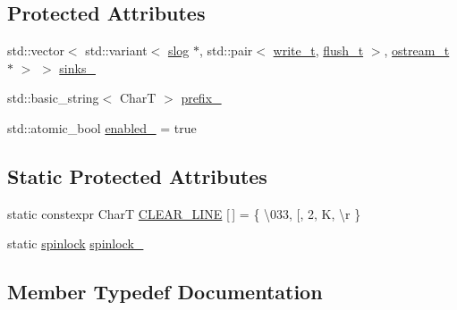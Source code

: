 \subsection*{Protected Attributes}
\begin{DoxyCompactItemize}
\item 
std\+::vector$<$ std\+::variant$<$ \hyperlink{structdevfix_1_1base_1_1slog}{slog} $\ast$, std\+::pair$<$ \hyperlink{structdevfix_1_1base_1_1slog_a5897ebe6b65ffd7a1845a6bca989f288}{write\+\_\+t}, \hyperlink{structdevfix_1_1base_1_1slog_a5c957ca5d7392786ede9f813ec40fb40}{flush\+\_\+t} $>$, \hyperlink{structdevfix_1_1base_1_1slog_a3602226e6adc9ea19626e25a0df085a6}{ostream\+\_\+t} $\ast$ $>$ $>$ \hyperlink{structdevfix_1_1base_1_1slog_ad2da16c81e93026a8094c53c2261cb33}{sinks\+\_\+}
\item 
std\+::basic\+\_\+string$<$ CharT $>$ \hyperlink{structdevfix_1_1base_1_1slog_a32d647fa732679ecb1fe679f1305f43a}{prefix\+\_\+}
\item 
std\+::atomic\+\_\+bool \hyperlink{structdevfix_1_1base_1_1slog_a5376d7ddd91f95c9d7fcb8629fcfcdf0}{enabled\+\_\+} = true
\end{DoxyCompactItemize}
\subsection*{Static Protected Attributes}
\begin{DoxyCompactItemize}
\item 
static constexpr CharT \hyperlink{structdevfix_1_1base_1_1slog_aa308e2dc79a5ef8ad14db038232b0fe3}{C\+L\+E\+A\+R\+\_\+\+L\+I\+NE} \mbox{[}$\,$\mbox{]} = \{ \textquotesingle{}\textbackslash{}033\textquotesingle{}, \textquotesingle{}\mbox{[}\textquotesingle{}, \textquotesingle{}2\textquotesingle{}, \textquotesingle{}K\textquotesingle{}, \textquotesingle{}\textbackslash{}r\textquotesingle{} \}
\item 
static \hyperlink{structdevfix_1_1base_1_1spinlock}{spinlock} \hyperlink{structdevfix_1_1base_1_1slog_a6bfea192aed809edbca0deacdce5b8df}{spinlock\+\_\+}
\end{DoxyCompactItemize}


\subsection{Member Typedef Documentation}
\mbox{\label{structdevfix_1_1base_1_1slog_a5c957ca5d7392786ede9f813ec40fb40}} 

